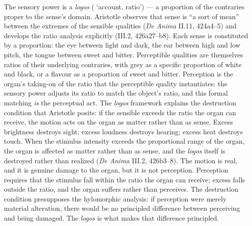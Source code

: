 The sensory power is a \textit{logos} ( `account, ratio') --- a proportion of the contraries proper to the sense's domain. Aristotle observes that sense is ``a sort of mean'' between the extremes of the sensible qualities (\textit{De Anima} II.11, 424a4--5) and develops the ratio analysis explicitly (III.2, 426a27--b8). Each sense is constituted by a proportion: the eye between light and dark, the ear between high and low pitch, the tongue between sweet and bitter. Perceptible qualities are themselves ratios of their underlying contraries, with grey as a specific proportion of white and black, or a flavour as a proportion of sweet and bitter. Perception is the organ's taking-on of the ratio that the perceptible quality instantiates: the sensory power adjusts its ratio to match the object's ratio, and this formal matching \textit{is} the perceptual act. The \textit{logos} framework explains the destruction condition that Aristotle posits: if the sensible exceeds the ratio the organ can receive, the motion acts on the organ as matter rather than as sense. Excess brightness destroys sight; excess loudness destroys hearing; excess heat destroys touch. When the stimulus intensity exceeds the proportional range of the organ, the organ is affected as matter rather than as sense, and the \textit{logos} itself is destroyed rather than realized (\textit{De Anima} III.2, 426b3--8). The motion is real, and it is genuine damage to the organ, but it is not perception. Perception requires that the stimulus fall within the ratio the organ can receive; excess falls outside the ratio, and the organ suffers rather than perceives. The destruction condition presupposes the hylomorphic analysis: if perception were merely material alteration, there would be no principled difference between perceiving and being damaged. The \textit{logos} is what makes that difference principled.

